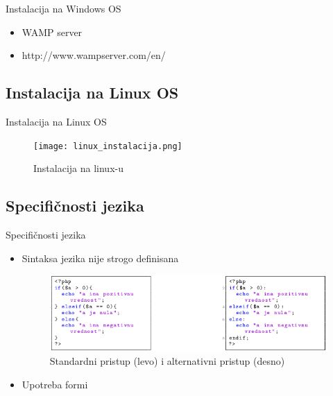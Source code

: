 \documentclass{beamer}
\begin{document}
\begin{frame}{Instalacija na Windows OS}
	\begin{itemize}
		\item WAMP server
		\item http://www.wampserver.com/en/
	\end{itemize}



\end{frame}

\subsection{Instalacija na Linux OS}

\begin{frame}{Instalacija na Linux OS}
	\begin{figure}
	\texttt{[image: linux\_instalacija.png]}
	\caption{\label{fig:your-figure}Instalacija na linux-u}
	\end{figure}
\end{frame}



\subsection{Specifičnosti jezika}
\begin{frame}{Specifičnosti jezika}
    \begin{itemize}
		\item Sintaksa jezika nije strogo definisana
		
		\begin{figure}[h!]
                \begin{center}
                \includegraphics[scale=0.40]{kod.png}
                \end{center}
                \caption{Standardni pristup (levo) i alternativni pristup (desno)}
                \label{fig:kod}
                \end{figure}
                
		\item Upotreba formi
	\end{itemize}
\end{frame}
\end{document}
